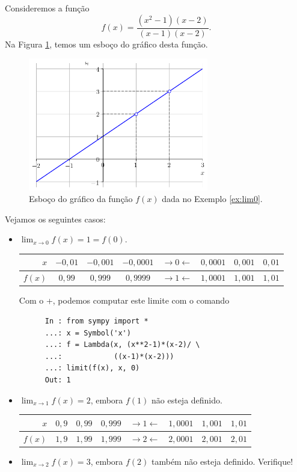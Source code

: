 \begin{ex}\label{ex:lim0}
  Consideremos a função
  \begin{equation}
    f(x) = \frac{(x^2-1)(x-2)}{(x-1)(x-2)}.
  \end{equation}
  Na Figura \ref{fig:ex_lim0}, temos um esboço do gráfico desta função.

  \begin{figure}[H]
    \centering
    \includegraphics[width=0.7\textwidth]{./cap_lim/dados/fig_ex_lim0/fig_ex_lim0}
    \caption{Esboço do gráfico da função $f(x)$ dada no Exemplo \ref{ex:lim0}.}
    \label{fig:ex_lim0}
  \end{figure}


  Vejamos os seguintes casos:
  \begin{itemize}
  \item $\displaystyle \lim_{x\to 0} f(x) = 1 = f(0)$.
    
    \begin{tabular}{r|ccc|c|ccc}
      $x$ & $-0,01$ & $-0,001$ & $-0,0001$ & $\rightarrow 0 \leftarrow$ & $0,0001$ & $0,001$ & $0,01$\\\hline
      $f(x)$ & $0,99$ & $0,999$ & $0,9999$ & $\rightarrow 1 \leftarrow$ & $1,0001$ & $1,001$ & $1,01$
    \end{tabular}

    \ifispython
    Com o {\python}+{\sympy}, podemos computar este limite com o comando
    \begin{lstlisting}
      In : from sympy import *
      ...: x = Symbol('x')
      ...: f = Lambda(x, (x**2-1)*(x-2)/ \
      ...:            ((x-1)*(x-2)))
      ...: limit(f(x), x, 0)
      Out: 1
    \end{lstlisting}
    \fi
  \item $\displaystyle \lim_{x\to 1} f(x) = 2$, embora $f(1)$ não esteja definido.
    
    \begin{tabular}{r|ccc|c|ccc}
      $x$ & $0,9$ & $0,99$ & $0,999$ & $\rightarrow 1 \leftarrow$ & $1,0001$ & $1,001$ & $1,01$\\\hline
      $f(x)$ & $1,9$ & $1,99$ & $1,999$ & $\rightarrow 2 \leftarrow$ & $2,0001$ & $2,001$ & $2,01$
    \end{tabular}
  \item $\displaystyle \lim_{x\to 2} f(x) = 3$, embora $f(2)$ também não esteja definido. Verifique!
  \end{itemize}
\end{ex}

